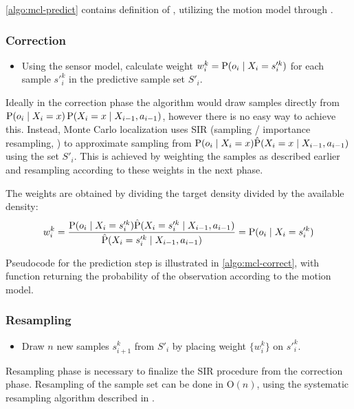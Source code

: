 	\autoref{algo:mcl-predict} contains definition of \predict{}, utilizing the motion
	model through \sampleFromActionModel{}.

\subsubsection{Correction}
	\begin{itemize}
	\item
	Using the sensor model, calculate weight \(w^k_i = \operatorname{\mathrm{P}}(o_i \mid X_i = s'^k_i)\)
	for each sample \(s'^k_i\) in the predictive sample set \(S'_i\).
	\end{itemize}

	Ideally in the correction phase the algorithm would draw samples directly from
	\(\operatorname{\mathrm{P}}(o_i \mid X_i = x) \operatorname{\mathrm{P}}(X_i = x \mid X_{i - 1}, a_{i - 1})\),
	however there is no easy way to achieve this.
	Instead, Monte Carlo localization 
	uses SIR (sampling / importance resampling, \cite{smith92})
	to approximate sampling from
	\(\operatorname{\mathrm{P}}(o_i \mid X_i = x) \hat{\operatorname{\mathrm{P}}}(X_i = x \mid X_{i - 1}, a_{i - 1})\) using the set \(S'_i\).
	This is achieved by weighting the samples as described earlier and resampling
	according to these weights in the next phase.

	The weights are obtained by dividing the target density divided by the available density:
	\begin{equation}
		w^k_i = 
		\frac{
			\operatorname{\mathrm{P}}(o_i \mid X_i = s'^k_i) \hat{\operatorname{\mathrm{P}}}(X_i = s'^k_i \mid X_{i - 1}, a_{i - 1})
		}{
			\hat{\operatorname{\mathrm{P}}}(X_i =  s'^k_i \mid X_{i - 1}, a_{i - 1})
		} = \operatorname{\mathrm{P}}(o_i \mid X_i = s'^k_i)
	\end{equation}

	Pseudocode for the prediction step is illustrated in \autoref{algo:mcl-correct},
	with function \observationProbability{} returning the probability of the observation
	according to the motion model.

\subsubsection{Resampling}
	\begin{itemize}
	\item
	Draw \(n\) new samples \(s^k_{i+1}\) from \(S'_i\) by placing
	weight \(\{w^k_i\}\) on \(s'^k_{i}\).
	\end{itemize}

	Resampling phase is necessary to finalize the SIR procedure from the correction phase.
	Resampling of the sample set can be done in \(\mathrm{O}(n)\), using the systematic
	resampling algorithm described in \cite{arulampalam01}.

